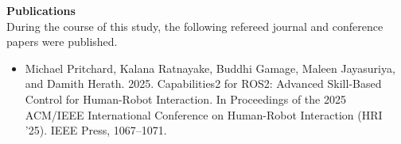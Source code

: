 %
%
\thispagestyle{plain}
{\noindent \huge \bf Publications}\\[20mm]
During the course of this study, the following refereed journal and conference papers were published.\\

\begin{itemize}
	\item Michael Pritchard, Kalana Ratnayake, Buddhi Gamage, Maleen Jayasuriya, and Damith Herath. 2025. Capabilities2 for ROS2: Advanced Skill-Based Control for Human-Robot Interaction. In Proceedings of the 2025 ACM/IEEE International Conference on Human-Robot Interaction (HRI '25). IEEE Press, 1067–1071.
\end{itemize}

\cleardoublepage